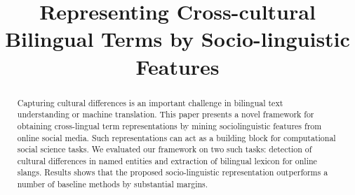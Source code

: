 \documentclass{article}
\title{Representing Cross-cultural Bilingual Terms by Socio-linguistic Features}
\author{}
\begin{document}
\begin{CJK}{UTF8}{gbsn}

\maketitle

\begin{abstract} 
Capturing cultural differences is an important challenge in bilingual text understanding
or machine translation. This paper presents a novel framework for obtaining cross-lingual 
term representations by mining sociolinguistic features from online social media. 
Such representations can act as a building block for computational social science tasks. 
We evaluated our framework on two such tasks: detection of cultural differences in named entities
and extraction of bilingual lexicon for online slangs. Results shows that the proposed 
socio-linguistic representation outperforms a number of baseline methods by substantial
margins.
\end{abstract}











\end{CJK}
\end{document}
